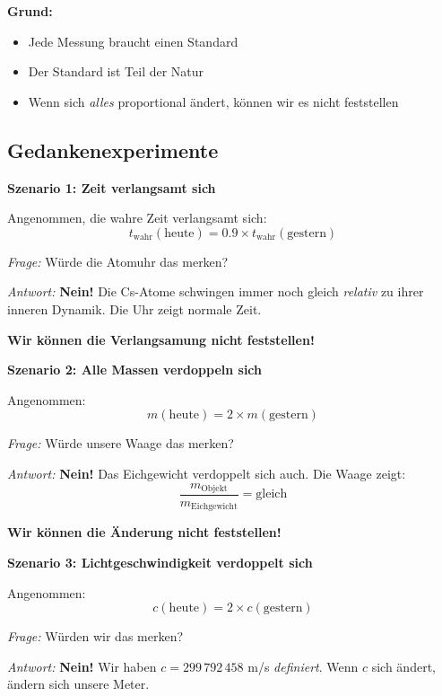 \textbf{Grund:}
\begin{itemize}[nosep]
	\item Jede Messung braucht einen Standard
	\item Der Standard ist Teil der Natur
	\item Wenn sich \textit{alles} proportional ändert, können wir es nicht feststellen
\end{itemize}

\subsection{Gedankenexperimente}

\textbf{Szenario 1: Zeit verlangsamt sich}

Angenommen, die wahre Zeit verlangsamt sich:
\begin{equation}
	t_\text{wahr}(\text{heute}) = 0.9 \times t_\text{wahr}(\text{gestern})
\end{equation}

\textit{Frage:} Würde die Atomuhr das merken?

\textit{Antwort:} \textbf{Nein!} Die Cs-Atome schwingen immer noch gleich \textit{relativ} zu ihrer inneren Dynamik. Die Uhr zeigt normale Zeit.

\textbf{Wir können die Verlangsamung nicht feststellen!}

\textbf{Szenario 2: Alle Massen verdoppeln sich}

Angenommen:
\begin{equation}
	m(\text{heute}) = 2 \times m(\text{gestern})
\end{equation}

\textit{Frage:} Würde unsere Waage das merken?

\textit{Antwort:} \textbf{Nein!} Das Eichgewicht verdoppelt sich auch. Die Waage zeigt:
\begin{equation}
	\frac{m_\text{Objekt}}{m_\text{Eichgewicht}} = \text{gleich}
\end{equation}

\textbf{Wir können die Änderung nicht feststellen!}

\textbf{Szenario 3: Lichtgeschwindigkeit verdoppelt sich}

Angenommen:
\begin{equation}
	c(\text{heute}) = 2 \times c(\text{gestern})
\end{equation}

\textit{Frage:} Würden wir das merken?

\textit{Antwort:} \textbf{Nein!} Wir haben $c = 299\,792\,458$ m/s \textit{definiert}. Wenn $c$ sich ändert, ändern sich unsere Meter.

